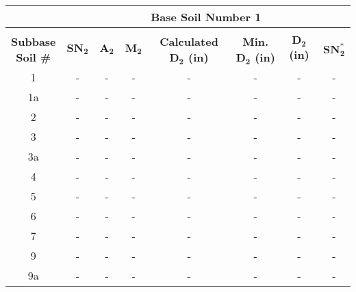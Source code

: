 \documentclass{article}
\begin{document}
\begin{center}
\begin{spacing}{1.6}
        \begin{tabular}{|c|ccccccc|}
            \hline    
            \multicolumn{1}{|l}{}                     & \multicolumn{7}{c|}{\textbf{Base Soil Number 1}}                                              \\\hline
            &&&&&&&\\
             \shortstack[c]{\textbf{Subbase}\\\textbf{Soil \#}} & $\bm{SN_2}$ & $\bm{A_2}$ & $\bm{M_2}$ & \textbf{Calculated $\bm{D_2}$ (in)} & \textbf{Min. $\bm{D_2}$ (in)} & \textbf{$\bm{D_2}$ (in)} & $\bm{SN_2^*}$  \\\hline
                                            1       & -     & -    & -    & -                    & -              & -         & -       \\
                                            1a      & -     & -    & -    & -                    & -              & -         & -       \\
                                            2       & -     & -    & -    & -                    & -              & -         & -       \\
                                            3       & -     & -    & -    & -                    & -              & -         & -       \\
                                            3a      & -     & -    & -    & -                    & -              & -         & -       \\
                                            4       & -     & -    & -    & -                    & -              & -         & -       \\
                                            5       & -     & -    & -    & -                    & -              & -         & -       \\
                                            6       & -     & -    & -    & -                    & -              & -         & -       \\
                                            7       & -     & -    & -    & -                    & -              & -         & -       \\
                                            9       & -     & -    & -    & -                    & -              & -         & -       \\
                                            9a      & -     & -    & -    & -                    & -              & -         & -       \\

\end{tabular}
\end{spacing}
\end{center}
\end{document}
